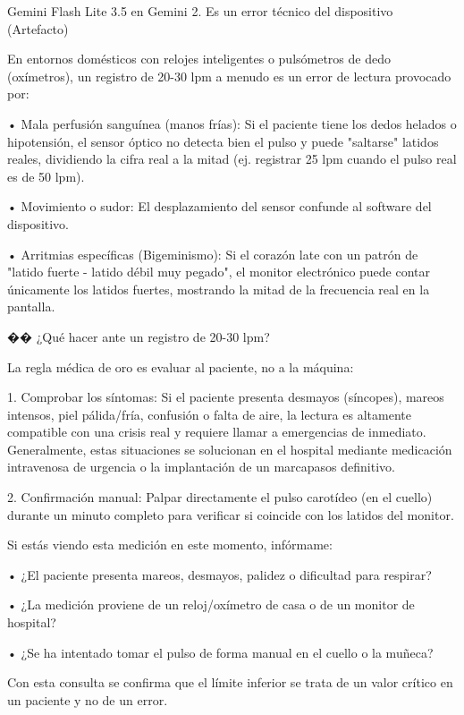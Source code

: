 \documentclass[12pt,a4paper,oneside]{book}
\begin{document}
\begin{iaresp}{Gemini Flash Lite 3.5 en Gemini}
2. Es un error técnico del dispositivo (Artefacto)

En entornos domésticos con relojes inteligentes o pulsómetros de dedo (oxímetros), un registro de 20-30 lpm a menudo es un error de lectura provocado por:

• Mala perfusión sanguínea (manos frías): Si el paciente tiene los dedos helados o hipotensión, el sensor óptico no detecta bien el pulso y puede "saltarse" latidos reales, dividiendo la cifra real a la mitad (ej. registrar 25 lpm cuando el pulso real es de 50 lpm).

• Movimiento o sudor: El desplazamiento del sensor confunde al software del dispositivo.

• Arritmias específicas (Bigeminismo): Si el corazón late con un patrón de "latido fuerte - latido débil muy pegado", el monitor electrónico puede contar únicamente los latidos fuertes, mostrando la mitad de la frecuencia real en la pantalla.

�� ¿Qué hacer ante un registro de 20-30 lpm?

La regla médica de oro es evaluar al paciente, no a la máquina:

1. Comprobar los síntomas: Si el paciente presenta desmayos (síncopes), mareos intensos, piel pálida/fría, confusión o falta de aire, la lectura es altamente compatible con una crisis real y requiere llamar a emergencias de inmediato. Generalmente, estas situaciones se solucionan en el hospital mediante medicación intravenosa de urgencia o la implantación de un marcapasos definitivo.

2. Confirmación manual: Palpar directamente el pulso carotídeo (en el cuello) durante un minuto completo para verificar si coincide con los latidos del monitor.

Si estás viendo esta medición en este momento, infórmame:

• ¿El paciente presenta mareos, desmayos, palidez o dificultad para respirar?

• ¿La medición proviene de un reloj/oxímetro de casa o de un monitor de hospital?

• ¿Se ha intentado tomar el pulso de forma manual en el cuello o la muñeca?
\end{iaresp}
\begin{iaanalisis}
Con esta consulta se confirma que el límite inferior se trata de un valor crítico en un paciente y no de un error.
\end{iaanalisis}
\end{document}
